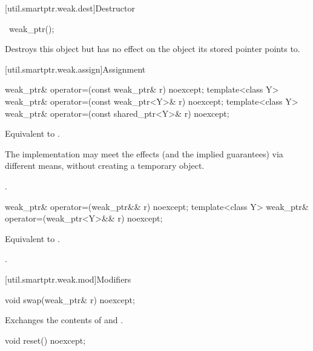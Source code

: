 [util.smartptr.weak.dest]{Destructor}

%
\begin{itemdecl}
~weak_ptr();
\end{itemdecl}

\begin{itemdescr}
\pnum
\effects
Destroys this  object but has no
effect on the object its stored pointer points to.
\end{itemdescr}

[util.smartptr.weak.assign]{Assignment}

%
\begin{itemdecl}
weak_ptr& operator=(const weak_ptr& r) noexcept;
template<class Y> weak_ptr& operator=(const weak_ptr<Y>& r) noexcept;
template<class Y> weak_ptr& operator=(const shared_ptr<Y>& r) noexcept;
\end{itemdecl}

\begin{itemdescr}
\pnum
\effects
Equivalent to .

\pnum
\remarks
The implementation may meet the effects (and the
implied guarantees) via different means, without creating a temporary object.

\pnum
\returns
{}.
\end{itemdescr}

%
\begin{itemdecl}
weak_ptr& operator=(weak_ptr&& r) noexcept;
template<class Y> weak_ptr& operator=(weak_ptr<Y>&& r) noexcept;
\end{itemdecl}

\begin{itemdescr}
\pnum
\effects
Equivalent to .

\pnum
\returns
{}.
\end{itemdescr}

[util.smartptr.weak.mod]{Modifiers}
%
\begin{itemdecl}
void swap(weak_ptr& r) noexcept;
\end{itemdecl}

\begin{itemdescr}
\pnum
\effects
Exchanges the contents of  and .
\end{itemdescr}

%
\begin{itemdecl}
void reset() noexcept;
\end{itemdecl}

